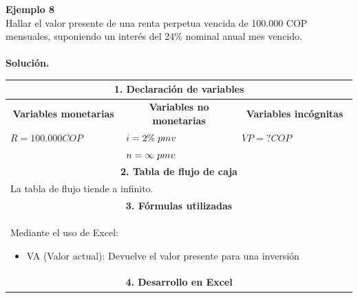 \textbf{Ejemplo 8}\\
Hallar el valor presente de una renta perpetua vencida de 100.000 COP mensuales, suponiendo un interés
del 24\% nominal anual mes vencido.\\ \\
\textbf{Solución.}
\begin{center}
 \renewcommand{\arraystretch}{1.5}%
 \begin{longtable}[H]{|p{0.333\linewidth}|p{0.3333\linewidth}|p{0.3333\linewidth}|}
  \hline
  \multicolumn{3}{|c|}{\cellcolor[HTML]{FFB183}\textbf{1. Declaración de variables}}          \\ \hline
  \multicolumn{1}{|c|}{\cellcolor[HTML]{FFB183}\textbf{Variables monetarias}}                   & \multicolumn{1}{|c|}{\cellcolor[HTML]{FFB183}\textbf{Variables no monetarias}}                   & \multicolumn{1}{|c|}{\cellcolor[HTML]{FFB183}\textbf{Variables incógnitas}}                                                                         \\ \hline
  $R= 100{.}000 COP $          & $i=2\% \hspace{1mm} pmv$ & $VP = ? COP$                       \\
   &  $n=\infty \hspace{1mm} pmv$   &                                  \\ \hline
  \multicolumn{3}{|c|}{\cellcolor[HTML]{FFB183}\textbf{2. Tabla de flujo de caja}}            \\ \hline
  \multicolumn{3}{|p{\columnwidth}|}{
  La tabla de flujo tiende a infinito.
  }                                                                                           \\ \hline
  \multicolumn{3}{|c|}{\cellcolor[HTML]{FFB183}\textbf{3. Fórmulas utilizadas}}               \\ \hline
  \multicolumn{3}{|p{\columnwidth}|}{Mediante el uso de Excel:
  \begin{itemize}
   \item VA (Valor actual): Devuelve el valor presente para una inversión
  \end{itemize}
  }                                                                                           \\ \hline
  \multicolumn{3}{|c|}{\cellcolor[HTML]{FFB183}\textbf{4. Desarrollo en Excel}}               \\ \hline

\end{longtable}
\end{center}
